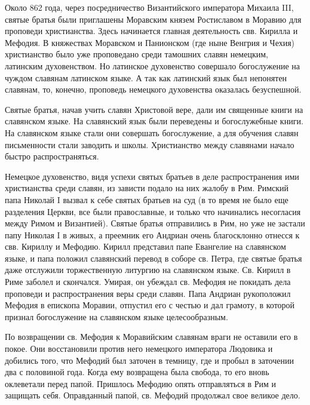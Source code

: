 \documentclass[11pt,a4paper,oneside]{memoir}
\begin{document}
        Около 862 года, через посредничество Византийского императора
        Михаила III, святые братья были приглашены Моравским князем
        Ростиславом в Моравию для проповеди христианства. Здесь
        начинается главная деятельность свв. Кирилла и Мефодия. В
        княжествах Моравском и Панионском (где ныне Венгрия и Чехия)
        христианство было уже проповедано среди тамошних славян
        немецким, латинским духовенством. Но латинское духовенство
        совершало богослужение на чуждом славянам латинском языке. А
        так как латинский язык был непонятен славянам, то, конечно,
        проповедь немецкого духовенства оказалась безуспешной.

        Святые братья, начав учить славян Христовой вере, дали им
        священные книги на славянском языке. На славянский язык были
        переведены и богослужебные книги. На славянском языке стали
        они совершать богослужение, а для обучения славян
        письменности стали заводить и школы. Христианство между
        славянами начало быстро распространяться.

        Немецкое духовенство, видя успехи святых братьев в деле
        распространения ими христианства среди славян, из зависти
        подало на них жалобу в Рим. Римский папа Николай I вызвал к
        себе святых братьев на суд (в то время не было еще разделения
          Церкви, все были православные, и только что начинались
        несогласия между Римом и Византией). Святые братья
        отправились в Рим, но уже не застали папу Николая I в живых,
        а преемник его Андриан очень благосклонно отнесся к свв.
        Кириллу и Мефодию. Кирилл представил папе Евангелие на
        славянском языке, и папа положил славянский перевод в соборе
        св. Петра, где святые братья даже отслужили торжественную
        литургию на славянском языке. Св. Кирилл в Риме заболел и
        скончался. Умирая, он убеждал св. Мефодия не покидать дела
        проповеди и распространения веры среди славян. Папа Андриан
        рукоположил Мефодия в епископа Моравии, отпустил его с честью
        и дал грамоту, в которой признал богослужение на славянском
        языке целесообразным.

        По возвращении св. Мефодия к Моравийским славянам враги не
        оставили его в покое. Они восстановили против него немецкого
        императора Людовика и добились того, что Мефодий был заточен
        в темницу, где и пробыл в заточении два с половиной года.
        Когда ему возвращена была свобода, то его вновь оклеветали
        перед папой. Пришлось Мефодию опять отправляться в Рим и
        защищать себя. Оправданный папой, св. Мефодий продолжал свое
        великое дело.
\end{document}

